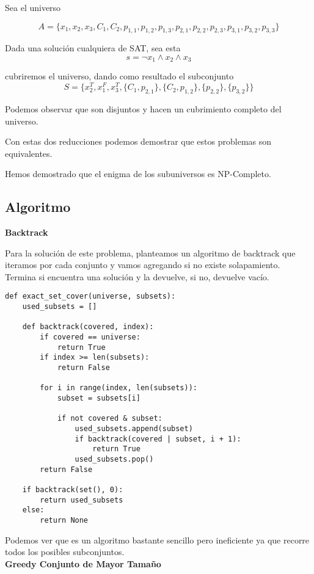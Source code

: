 \documentclass{article}
\begin{document}
Sea el universo

\[A = \{x_1, x_2, x_3, C_1, C_2, p_{1,1}, p_{1,2}, p_{1,3}, p_{2,1}, p_{2,2} ,p_{2,3}, p_{3,1}, p_{3,2}, p_{3,3}\}\]

Dada una solución cualquiera de SAT, sea esta
\[s = \neg x_1 \wedge x_2 \wedge x_3\]

cubriremos el universo, dando como resultado el subconjunto
\[S = \{ x_{2}^{T}, x_{1}^{F}, x_{3}^{T}, \{C_1, p_{2,1}\}, \{C_2, p_{1,2}\}, \{p_{2,2}\}, \{p_{3,2}\} \}\]

 Podemos observar que son disjuntos y hacen un cubrimiento completo del universo.

Con estas dos reducciones podemos demostrar que estos problemas son equivalentes.

Hemos demostrado que el enigma de los subuniversos es NP-Completo.


\subsection{Algoritmo}

\textbf{Backtrack}

Para la solución de este problema, planteamos un algoritmo de backtrack que iteramos por cada conjunto y vamos agregando si no existe solapamiento. Termina si encuentra una solución y la devuelve, si no, devuelve vacío.

\begin{lstlisting}
def exact_set_cover(universe, subsets):
    used_subsets = []

    def backtrack(covered, index):
        if covered == universe:
            return True
        if index >= len(subsets):
            return False

        for i in range(index, len(subsets)):
            subset = subsets[i]

            if not covered & subset:
                used_subsets.append(subset)
                if backtrack(covered | subset, i + 1):
                    return True
                used_subsets.pop()
        return False

    if backtrack(set(), 0):
        return used_subsets
    else:
        return None
\end{lstlisting}

Podemos ver que es un algoritmo bastante sencillo pero ineficiente ya que recorre todos los posibles subconjuntos.\\

\textbf{Greedy Conjunto de Mayor Tamaño}
\end{document}
